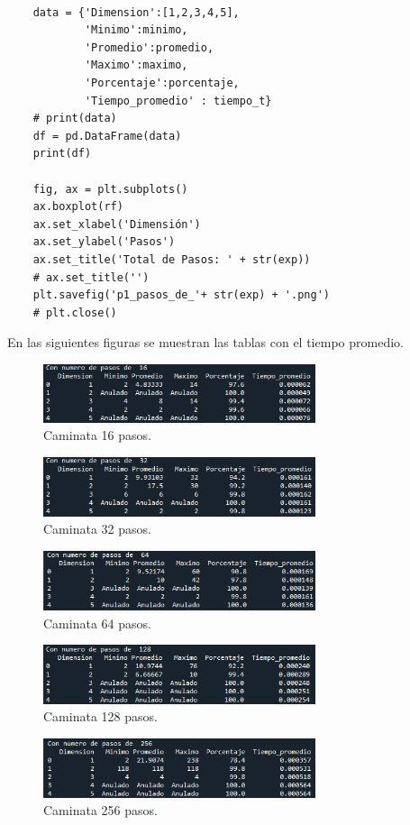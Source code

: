 \documentclass{article}
\begin{document}
\begin{verbatim}
            
    data = {'Dimension':[1,2,3,4,5], 
            'Minimo':minimo, 
            'Promedio':promedio, 
            'Maximo':maximo,
            'Porcentaje':porcentaje,
            'Tiempo_promedio' : tiempo_t} 
    # print(data)
    df = pd.DataFrame(data)
    print(df)
        
    fig, ax = plt.subplots()
    ax.boxplot(rf)
    ax.set_xlabel('Dimensión')
    ax.set_ylabel('Pasos')
    ax.set_title('Total de Pasos: ' + str(exp))
    # ax.set_title('')
    plt.savefig('p1_pasos_de_'+ str(exp) + '.png')
    # plt.close()

\end{verbatim}

En las siguientes figuras se muestran las tablas con el tiempo promedio.

\begin{figure}[H]
\centering
\includegraphics[width=80mm]{tiempo_pasos16.png}
\caption{\label{fig1}Caminata 16 pasos.}
\end{figure}
\begin{figure}[H]
\centering
\includegraphics[width=80mm]{tiempo_pasos32.png}
\caption{\label{fig1}Caminata 32 pasos.}
\end{figure}
\begin{figure}[H]
\centering
\includegraphics[width=80mm]{tiempo_pasos64.png}
\caption{\label{fig1}Caminata 64 pasos.}
\end{figure}
\begin{figure}[H]
\centering
\includegraphics[width=80mm]{tiempo_pasos128.png}
\caption{\label{fig1}Caminata 128 pasos.}
\end{figure}
\begin{figure}[H]
\centering
\includegraphics[width=80mm]{tiempo_pasos256.png}
\caption{\label{fig1}Caminata 256 pasos.}
\end{figure}
\end{document}
